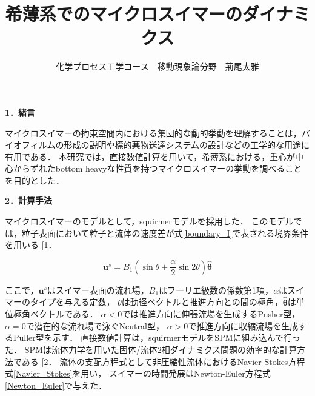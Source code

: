 \documentclass[twocolumns,10pt,a4j]{jarticle}
\title{\Large 希薄系でのマイクロスイマーのダイナミクス\vspace{-3truemm}}
\author{\large 化学プロセス工学コース　移動現象論分野　荊尾太雅\vspace{-10zh}}
\date{}
\makeatletter
\DeclareRobustCommand\cite{\unskip
  \@ifnextchar[{\@tempswatrue\@citex}{\@tempswafalse\@citex[]}}
\makeatother
\begin{document}



  \noindent
  \textbf{\large 1．緒言}
  \par
マイクロスイマーの拘束空間内における集団的な動的挙動を理解することは，バイオフィルムの形成の説明や標的薬物送達システムの設計などの工学的な用途に有用である．
本研究では，直接数値計算を用いて，希薄系における，重心が中心からずれたbottom heavyな性質を持つマイクロスイマーの挙動を調べることを目的とした．


  \noindent
  \textbf{\large 2．計算手法}
  \par
マイクロスイマーのモデルとして，squirmerモデルを採用した．
このモデルでは，粒子表面において粒子と流体の速度差が式\eqref{boundary_I}で表される境界条件を用いる\cite{1}．

  \vspace{-3truemm}
    \begin{equation}
      \boldsymbol{u}^s = B_1 \left( \sin{\theta} + \frac{\alpha}{2} \sin{2\theta} \right) \hat{\boldsymbol{\theta}}
      \label{boundary_I}
    \end{equation}
  \vspace{-4truemm}

  \noindent
ここで，$\boldsymbol{u}^s$はスイマー表面の流れ場，$B_1$はフーリエ級数の係数第1項，$\alpha$はスイマーのタイプを与える定数，
$\theta$は動径ベクトルと推進方向との間の極角，$\hat{\boldsymbol{\theta}}$は単位極角ベクトルである．
$\alpha<0$では推進方向に伸張流場を生成するPusher型，
$\alpha=0$で潜在的な流れ場で泳ぐNeutral型，
$\alpha>0$で推進方向に収縮流場を生成するPuller型を示す．
直接数値計算は，squirmerモデルをSPMに組み込んで行った．
SPMは流体力学を用いた固体/流体2相ダイナミクス問題の効率的な計算方法である\cite{2}．
流体の支配方程式として非圧縮性流体におけるNavier-Stokes方程式\eqref{Navier_Stokes}を用い，
スイマーの時間発展はNewton-Euler方程式\eqref{Newton_Euler}で与えた．
\end{document}
